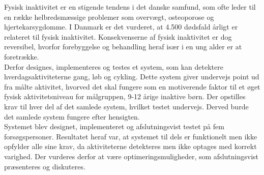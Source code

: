 Fysisk inaktivitet er en stigende tendens i det danske samfund, som ofte leder til en række helbredsmæssige problemer som overvægt, osteoporose og hjertekarsygdomme. I Danmark er det vurderet, at 4.500 dødsfald årligt er relateret til fysisk inaktivitet. Konsekvenserne af fysisk inaktivitet er dog reversibel, hvorfor forebyggelse og behandling heraf især i en ung alder er at foretrække.\\
Derfor designes, implementeres og testes et system, som kan detektere hverdagsaktiviteterne gang, løb og cykling. Dette system giver undervejs point ud fra målte aktivitet, hvorved det skal fungere som en motiverende faktor til et øget fysisk aktivitetsniveau for målgruppen, 9-12 årige inaktive børn. Der opstilles krav til hver del af det samlede system, hvilket testet undervejs. Derved burde det samlede system fungere efter hensigten.\\
Systemet blev designet, implementeret og afslutningsvist testet på fem forsøgspersoner. Resultatet heraf var, at systemet til dels er funktionelt men ikke opfylder alle sine krav, da aktiviteterne detekteres men ikke optages med korrekt varighed. Der vurderes derfor at være optimeringsmuligheder, som afslutningsvist præsenteres og diskuteres.